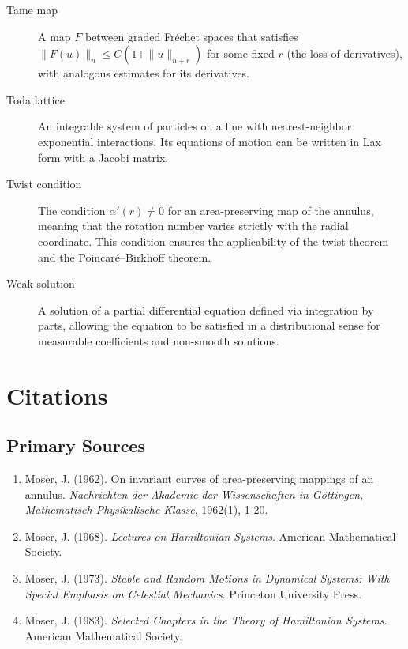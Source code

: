 \begin{description}
\item[Tame map] A map $F$ between graded Fr\'echet spaces that satisfies $\|F(u)\|_n \leq C(1 + \|u\|_{n+r})$ for some fixed $r$ (the loss of derivatives), with analogous estimates for its derivatives.

\item[Toda lattice] An integrable system of particles on a line with nearest-neighbor exponential interactions. Its equations of motion can be written in Lax form with a Jacobi matrix.

\item[Twist condition] The condition $\alpha'(r) \neq 0$ for an area-preserving map of the annulus, meaning that the rotation number varies strictly with the radial coordinate. This condition ensures the applicability of the twist theorem and the Poincar\'e--Birkhoff theorem.

\item[Weak solution] A solution of a partial differential equation defined via integration by parts, allowing the equation to be satisfied in a distributional sense for measurable coefficients and non-smooth solutions.

\end{description}

\section{Citations}

\subsection*{Primary Sources}
\begin{enumerate}
    \item Moser, J. (1962). On invariant curves of area-preserving mappings of an annulus. \textit{Nachrichten der Akademie der Wissenschaften in Göttingen, Mathematisch-Physikalische Klasse}, 1962(1), 1-20.
    \item Moser, J. (1968). \textit{Lectures on Hamiltonian Systems}. American Mathematical Society.
    \item Moser, J. (1973). \textit{Stable and Random Motions in Dynamical Systems: With Special Emphasis on Celestial Mechanics}. Princeton University Press.
    \item Moser, J. (1983). \textit{Selected Chapters in the Theory of Hamiltonian Systems}. American Mathematical Society.
\end{enumerate}

